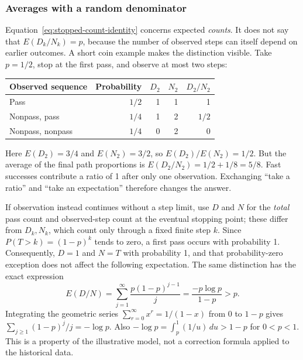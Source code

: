 \subsubsection{Averages with a random denominator}
Equation~\eqref{eq:stopped-count-identity} concerns expected \emph{counts}. It does not say that $E(D_k/N_k)=p$, because the number of observed steps can itself depend on earlier outcomes. A short coin example makes the distinction visible. Take $p=1/2$, stop at the first pass, and observe at most two steps:
\begin{center}
\begin{tabular}{lrrrr}
\toprule
Observed sequence & Probability & $D_2$ & $N_2$ & $D_2/N_2$ \\
\midrule
Pass & $1/2$ & 1 & 1 & 1 \\
Nonpass, pass & $1/4$ & 1 & 2 & $1/2$ \\
Nonpass, nonpass & $1/4$ & 0 & 2 & 0 \\
\bottomrule
\end{tabular}
\end{center}
Here $E(D_2)=3/4$ and $E(N_2)=3/2$, so $E(D_2)/E(N_2)=1/2$. But the average of the final path proportions is $E(D_2/N_2)=1/2+1/8=5/8$. Fast successes contribute a ratio of 1 after only one observation. Exchanging ``take a ratio'' and ``take an expectation'' therefore changes the answer.

If observation instead continues without a step limit, use $D$ and $N$ for the \emph{total} pass count and observed-step count at the eventual stopping point; these differ from $D_k,N_k$, which count only through a fixed finite step $k$. Since $P(T>k)=(1-p)^k$ tends to zero, a first pass occurs with probability 1. Consequently, $D=1$ and $N=T$ with probability 1, and that probability-zero exception does not affect the following expectation. The same distinction has the exact expression
\[
 E(D/N)=\sum_{j=1}^{\infty}\frac{p(1-p)^{j-1}}{j}
 =\frac{-p\log p}{1-p}>p.
\]
Integrating the geometric series $\sum_{r=0}^{\infty}x^r=1/(1-x)$ from 0 to $1-p$ gives $\sum_{j\ge1}(1-p)^j/j=-\log p$. Also $-\log p=\int_p^1(1/u)\,du>1-p$ for $0<p<1$. This is a property of the illustrative model, not a correction formula applied to the historical data.

